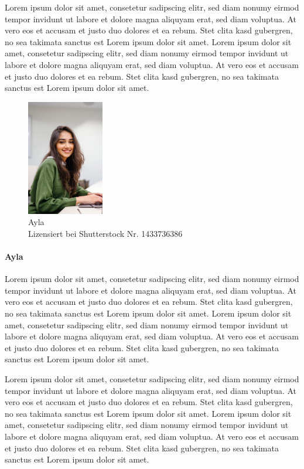 Lorem ipsum dolor sit amet, consetetur sadipscing elitr, sed diam nonumy eirmod tempor invidunt ut labore et dolore magna aliquyam erat, sed diam voluptua. At vero eos et accusam et justo duo dolores et ea rebum. Stet clita kasd gubergren, no sea takimata sanctus est Lorem ipsum dolor sit amet. Lorem ipsum dolor sit amet, consetetur sadipscing elitr, sed diam nonumy eirmod tempor invidunt ut labore et dolore magna aliquyam erat, sed diam voluptua. At vero eos et accusam et justo duo dolores et ea rebum. Stet clita kasd gubergren, no sea takimata sanctus est Lorem ipsum dolor sit amet.

\begin{figure}
    \vspace{-\intextsep}
    \centering
    \includegraphics[width=0.3\textwidth]{contents/06_model_evaluation/01_integration/res/persona_picture_ayla.png}
    \caption{Ayla\\Lizensiert bei Shutterstock Nr. 1433736386}
\end{figure}

\paragraph{Ayla} Lorem ipsum dolor sit amet, consetetur sadipscing elitr, sed diam nonumy eirmod tempor invidunt ut labore et dolore magna aliquyam erat, sed diam voluptua. At vero eos et accusam et justo duo dolores et ea rebum. Stet clita kasd gubergren, no sea takimata sanctus est Lorem ipsum dolor sit amet. Lorem ipsum dolor sit amet, consetetur sadipscing elitr, sed diam nonumy eirmod tempor invidunt ut labore et dolore magna aliquyam erat, sed diam voluptua. At vero eos et accusam et justo duo dolores et ea rebum. Stet clita kasd gubergren, no sea takimata sanctus est Lorem ipsum dolor sit amet.

Lorem ipsum dolor sit amet, consetetur sadipscing elitr, sed diam nonumy eirmod tempor invidunt ut labore et dolore magna aliquyam erat, sed diam voluptua. At vero eos et accusam et justo duo dolores et ea rebum. Stet clita kasd gubergren, no sea takimata sanctus est Lorem ipsum dolor sit amet. Lorem ipsum dolor sit amet, consetetur sadipscing elitr, sed diam nonumy eirmod tempor invidunt ut labore et dolore magna aliquyam erat, sed diam voluptua. At vero eos et accusam et justo duo dolores et ea rebum. Stet clita kasd gubergren, no sea takimata sanctus est Lorem ipsum dolor sit amet.
